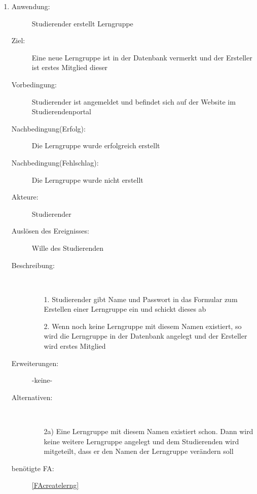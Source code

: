 \documentclass[parskip=full]{scrartcl}
\newcommand{\swtLabel}[1]{\textbf{/#1\arabic*0/}}
\begin{document}
\begin{enumerate}[label=\swtLabel{S}]
  
  \item \label{UCstudCrealernG}
  \begin{description}
  \item[Anwendung:] Studierender erstellt \gls{Lerngruppe}
  \item[Ziel:] Eine neue \gls{Lerngruppe} ist in der Datenbank vermerkt und der
  Ersteller ist erstes Mitglied dieser
  	\item[Vorbedingung:] Studierender ist angemeldet und befindet sich auf der
  	Website im Studierendenportal
  	\item[Nachbedingung(Erfolg):] Die \gls{Lerngruppe} wurde erfolgreich erstellt
  	\item[Nachbedingung(Fehlschlag):] Die \gls{Lerngruppe} wurde nicht erstellt
  	\item[Akteure:] Studierender
  	\item[Auslösen des Ereignisses:] Wille des Studierenden
  	\item[Beschreibung:]~
  	\begin{enumerate}
  	  \item[1.] Studierender gibt Name und Passwort in das Formular zum Erstellen
  	  einer \gls{Lerngruppe} ein und schickt dieses ab %
  	  \item[2.] Wenn noch keine \gls{Lerngruppe} mit diesem Namen existiert, so
  	  wird die \gls{Lerngruppe} in der Datenbank angelegt und der Ersteller wird
  	  erstes Mitglied
  	\end{enumerate}
  	\item[Erweiterungen:] -keine-
  	\item[Alternativen:] ~
  	\begin{enumerate}
  	  \item[2a)] Eine \gls{Lerngruppe} mit diesem Namen existiert schon. Dann
  	  wird keine weitere \gls{Lerngruppe} angelegt und dem Studierenden wird
  	  mitgeteilt, dass er den Namen der \gls{Lerngruppe} verändern soll
  	 \end{enumerate}
  	 \item[benötigte FA:] \ref{FAcreatelerng}
  \end{description}
   

\end{enumerate}
\end{document}
